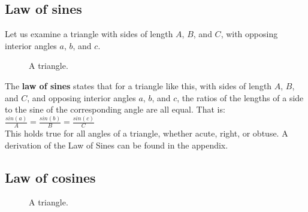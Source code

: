 \subsection{Law of sines}

Let us examine a triangle with sides of length $A$, $B$, and $C$, with opposing interior angles $a$, $b$, and $c$.\\

\begin{figure}[htb]
\center
\caption{A triangle.}
\label{fig:A triangle}
\end{figure}


The {\bf law of sines} states that for a triangle like this, with sides of length $A$, $B$, and $C$, and opposing interior angles $a$, $b$, and $c$, the ratios of the lengths of a side to the sine of the corresponding angle are all equal.  That is:\\

\tab$\frac{sin(a)}{A} = \frac{sin(b)}{B} = \frac{sin(c)}{C}$\\

This holds true for all angles of a triangle, whether acute, right, or obtuse.  A derivation of the Law of Sines can be found in the appendix.\\

\subsection{Law of cosines}

\begin{figure}[htb]
\center
\caption{A triangle.}
\label{fig:A triangle}
\end{figure}

